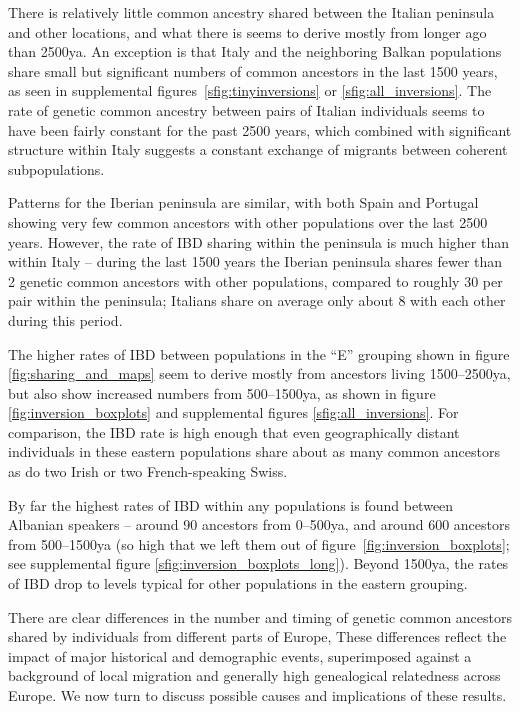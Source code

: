 \documentclass{article}
\begin{document}
There is relatively little common ancestry shared between the Italian peninsula and other locations,
and what there is seems to derive mostly from longer ago than 2500ya.
An exception is that Italy and the neighboring Balkan populations share small but significant numbers of common ancestors in the last 1500 years,
as seen in supplemental figures~\ref{sfig:tinyinversions} or \ref{sfig:all_inversions}.
The rate of genetic common ancestry between pairs of Italian individuals seems to have been fairly constant for the past 2500 years,
which combined with significant structure within Italy suggests a constant exchange of migrants between coherent subpopulations.

Patterns for the Iberian peninsula are similar,
with both Spain and Portugal showing very few common ancestors with other populations over the last 2500 years.
However, the rate of IBD sharing within the peninsula is much higher than within Italy -- during the last 1500 years
the Iberian peninsula shares fewer than 2 genetic common ancestors with other populations,
compared to roughly 30 per pair within the peninsula;
Italians share on average only about 8 with each other during this period.


The higher rates of IBD between populations in the ``E'' grouping shown in figure \ref{fig:sharing_and_maps}
seem to derive mostly from ancestors living 1500--2500ya,
but also show increased numbers from 500--1500ya,
as shown in figure \ref{fig:inversion_boxplots} and supplemental figures \ref{sfig:all_inversions}.
For comparison, the IBD rate is high enough that
even geographically distant individuals in these eastern populations
share about as many common ancestors 
as do two Irish or two French-speaking Swiss.
 


By far the highest rates of IBD within any populations is found between Albanian speakers --
around 90 ancestors from 0--500ya, and around 600 ancestors from 500--1500ya
(so high that we left them out of figure~\ref{fig:inversion_boxplots}; see supplemental figure \ref{sfig:inversion_boxplots_long}).
Beyond 1500ya, the rates of IBD drop to levels typical for other populations in the eastern grouping.


There are clear differences in the number and timing of genetic common ancestors
shared by individuals from different parts of Europe,
These differences reflect the impact of major historical and demographic events, 
superimposed against a background of local migration and generally high genealogical relatedness across Europe.
We now turn to discuss possible causes and implications of these results.
\end{document}

